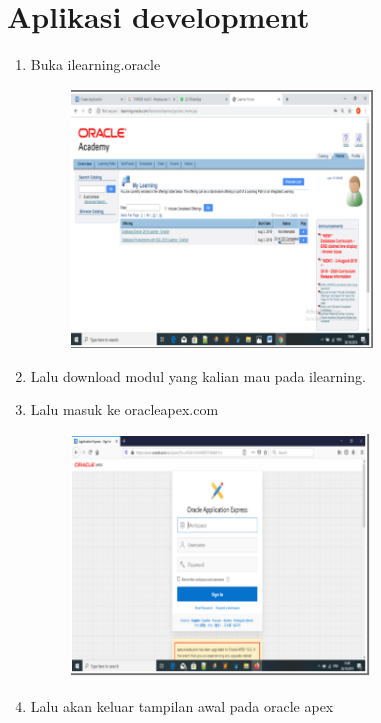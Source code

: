 \documentclass{article}
\begin{document}
\begin{enumerate}
\begin{enumerate}
\begin{figure}[h]
            \end{figure}
\newpage \section{Aplikasi development}
\begin{enumerate}
    \item Buka ilearning.oracle
    \begin{figure}[h]
            \centerline{\includegraphics[width=8cm]{image/a.PNG}}
            \end{figure}
    \item Lalu download modul yang kalian mau pada ilearning.
    \item Lalu masuk ke oracleapex.com
    \begin{figure}[h]
            \centerline{\includegraphics[width=8cm]{image/b.PNG}}
            \end{figure}
    \newpage \item Lalu akan keluar tampilan awal pada oracle apex
    \begin{figure}[h]

\end{figure}
\end{enumerate}
\end{enumerate}
\end{enumerate}
\end{document}
